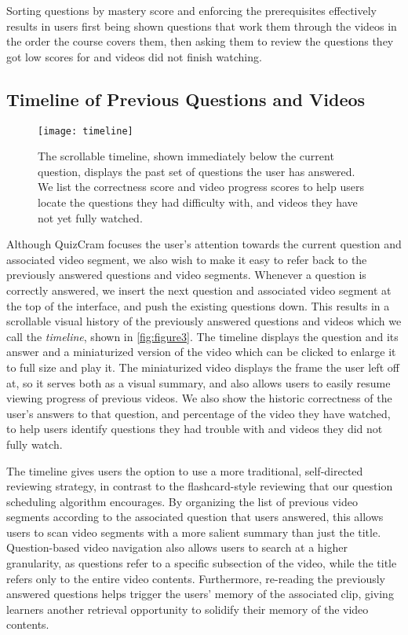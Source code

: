 \documentclass{chi-ext}
\begin{document}
Sorting questions by mastery score and enforcing the prerequisites effectively results in users first being shown questions that work them through the videos in the order the course covers them, then asking them to review the questions they got low scores for and videos did not finish watching.

\subsection{Timeline of Previous Questions and Videos}

\begin{figure}
\centering
\texttt{[image: timeline]}
\caption{The scrollable timeline, shown immediately below the current question, displays the past set of questions the user has answered. We list the correctness score and video progress scores to help users locate the questions they had difficulty with, and videos they have not yet fully watched.}
\label{fig:figure3}
\end{figure}

Although QuizCram focuses the user's attention towards the current question and associated video segment, we also wish to make it easy to refer back to the previously answered questions and video segments. Whenever a question is correctly answered, we insert the next question and associated video segment at the top of the interface, and push the existing questions down. This results in a scrollable visual history of the previously answered questions and videos which we call the \emph{timeline}, shown in \autoref{fig:figure3}. The timeline displays the question and its answer and a miniaturized version of the video which can be clicked to enlarge it to full size and play it. The miniaturized video displays the frame the user left off at, so it serves both as a visual summary, and also allows users to easily resume viewing progress of previous videos. We also show the historic correctness of the user's answers to that question, and percentage of the video they have watched, to help users identify questions they had trouble with and videos they did not fully watch.

The timeline gives users the option to use a more traditional, self-directed reviewing strategy, in contrast to the flashcard-style reviewing that our question scheduling algorithm encourages. By organizing the list of previous video segments according to the associated question that users answered, this allows users to scan video segments with a more salient summary than just the title. Question-based video navigation also allows users to search at a higher granularity, as questions refer to a specific subsection of the video, while the title refers only to the entire video contents. Furthermore, re-reading the previously answered questions helps trigger the users' memory of the associated clip, giving learners another retrieval opportunity to solidify their memory of the video contents.
\end{document}
